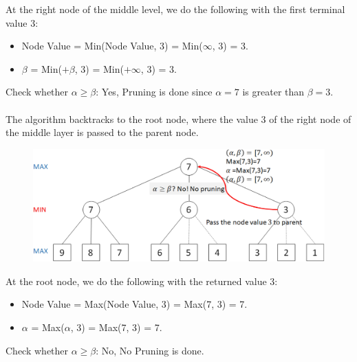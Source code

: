 \documentclass{book}
\begin{document}
At the right node of the middle level, we do the following with the first terminal value 3:
\begin{itemize}
    \item Node Value = Min(Node Value, 3) = Min($\infty$, 3) = 3.
    \item $\beta$ = Min($+\beta$, 3) = Min($+\infty$, 3) = 3.
\end{itemize}
Check whether $\alpha \geq \beta$: Yes, Pruning is done since $\alpha = 7$ is greater than $\beta = 3$.\\
\vspace{1.2cm}
\\
The algorithm backtracks to the root node, where the value 3 of the right node of the middle layer is passed to the parent node.\\
\begin{figure}
    \includegraphics[scale=0.09]{chapter 10/ch10_figure11.jpeg}
\end{figure}
At the root node, we do the following with the returned value 3:
\begin{itemize}
    \item Node Value = Max(Node Value, 3) = Max(7, 3) = 7.
    \item $\alpha$ = Max($\alpha$, 3) = Max(7, 3) = 7.
\end{itemize}
Check whether $\alpha \geq \beta$: No, No Pruning is done.\\
\vspace{1.5cm}
\end{document}
